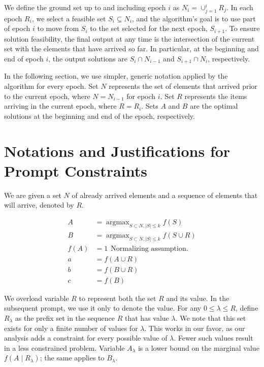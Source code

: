 \documentclass[11pt]{article}
\DeclareMathOperator*{\argmax}{argmax}
\begin{document}
We define the ground set up to and including epoch $i$ as $N_i = \cup_{j=1}^i R_j$.
In each epoch $R_i$, we select a feasible set $S_i \subseteq N_i$, and the algorithm's goal is to use part of epoch $i$ to move from $S_i$ to the set selected for the next epoch, $S_{i+1}$.
To ensure solution feasibility, the final output at any time is the intersection of the current set with the elements that have arrived so far. In particular, at the beginning and end of epoch $i$, the output solutions are $S_i \cap N_{i-1}$ and $S_{i+1} \cap N_i$, respectively.

In the following section, we use simpler, generic notation applied by the algorithm for every epoch. Set $N$ represents the set of elements that arrived prior to the current epoch, where $N = N_{i-1}$ for epoch $i$. Set $R$ represents the items arriving in the current epoch, where $R = R_i$. Sets $A$ and $B$ are the optimal solutions at the beginning and end of the epoch, respectively.


\section{Notations and Justifications for Prompt Constraints}
We are given a set $N$ of already arrived elements and a sequence of elements that will arrive, denoted by $R$.

\begin{align*}
    A    & = \argmax_{S \subset N, |S| \leq k} f(S)        \\
    B    & = \argmax_{S \subset N, |S| \leq k} f(S \cup R) \\
    f(A) & = 1 \ \ \text{Normalizing assumption.}          \\
    a    & = f(A \cup R)                                   \\
    b    & = f(B \cup R)                                   \\
    c    & = f(B)
\end{align*}

We overload variable $R$ to represent both the set $R$ and its value. In the subsequent prompt, we use it only to denote the value.
For any $0 \le \lambda \le R$, define $R_{\lambda}$ as the prefix set in the sequence $R$ that has value $\lambda$. We note that this set exists for only a finite number of values for $\lambda$. This works in our favor, as our analysis adds a constraint for every possible value of $\lambda$. Fewer such values result in a less constrained problem.
Variable $A_{\lambda}$ is a lower bound on the marginal value $f(A \mid R_{\lambda})$; the same applies to $B_{\lambda}$.
\end{document}
